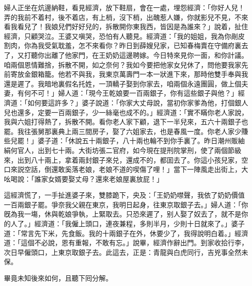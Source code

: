 婦人正坐在炕邊納鞋，看見經濟，放下鞋扇，會在一處，埋怨經濟：「你好人兒！弄的我前不着村，後不着店，有上梢，沒下梢，出醜惹人嫌，你就影兒不見，不來看我看兒了！我娘兒們好好兒的，拆散開你東我西，皆因是為誰來？」說着，扯住經濟，只顧哭泣。王婆又嗔哭，恐怕有人聽見。經濟道：「我的姐姐，我為你剮皮割肉，你為我受氣耽羞，怎不來看你？昨日到薛嫂兒家，已知春梅賣在守備府裏去了，又打聽你出離了他家門，在王奶奶這邊聘嫁。今日特來見你一面，和你計議。咱兩個恩情難捨，拆散不開，如之奈何？我如今要把他家女兒休了，問他要我家先前寄放金銀箱籠。他若不與我，我東京萬壽門一本一狀進下來，那時他雙手奉與我還是遲了。我暗地裏假名托姓，一頂轎子娶到你家去，咱兩個永遠團圓，做上個夫妻，有何不可！」婦人道：「現今王乾娘要一百兩銀子，你有這些銀子與他？」經濟道：「如何要這許多？」婆子說道：「你家大丈母說，當初你家爹為他，打個銀人兒也還多，定要一百兩銀子，少一絲毫也成不的。」經濟道：「實不瞞你老人家說，我與六姐打得熱了，拆散不開。看你老人家下顧，退下一半兒來，五六十兩銀子也罷。我往張舅那裏典上兩三間房子，娶了六姐家去，也是春風一度。你老人家少賺些兒罷！」婆子道：「休說五十兩銀子，八十兩也輪不到你手裏了。昨日潮州販紬絹何官人，出到七十兩。大街坊張二官府，如今現在提刑院掌刑，使了兩個節級來，出到八十兩上，拿着兩封銀子來兑，還成不的，都囬去了。你這小孩兒家，空口來説空話，倒還敢奚落老娘，老娘不道的喫傷了哩！」當下一陣風走出街上，大吆喝說：「誰家女婿要娶丈母？還來老娘屋裏放屁！」

這經濟慌了，一手扯進婆子來，雙膝跪下，央及：「王奶奶噤聲，我依了奶奶價值一百兩銀子罷。爭奈我父親在東京，我明日起身，往東京取銀子去。」婦人道：「你旣為我一塲，休與乾娘爭執，上緊取去。只恐來遲了，别人娶了奴去了，就不是你的人了。」經濟道：「我僱上頭口，連夜兼程，多則半月，少則十日就來了。」婆子道：「常言先下米，先食飯。我的十兩銀子在外，休要少了，我得說明白着。」經濟道：「這個不必說，恩有重報，不敢有忘。」說畢，經濟作辭出門。到家收拾行李，次日早僱頭口，上東京取銀子去。此這去，正是：青龍與白虎同行，吉兇事全然未保。

畢竟未知後來如何，且聽下囘分解。

